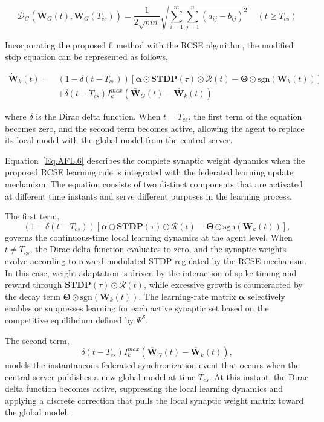 \begin{equation} \label{Eq.AFL.5}
\mathcal{D}_{G}(\bm{\overline{W}}_{G}(t), \bm{\overline{W}}_{G}(T_{cs})) = \frac{1}{2 \sqrt{mn}}\sqrt{\sum_{i=1}^{m}\sum_{j=1}^{n} (a_{ij} - b_{ij})^2}\;\;\;\; (t \geq T_{cs})
\end{equation}

\noindent Incorporating the proposed \ac{fl} method with the \ac{RCSE} algorithm, the modified \ac{stdp} equation can be represented as follows,

\begin{align} \label{Eq.AFL.6}
    \dot{\bm{W}}_{k}(t) = & (1-\delta(t-T_{cs})) \left[ \bm{\alpha} \odot \textbf{STDP}(\tau) \odot \mathcal{R}(t) - \bm{\Theta} \odot \text{sgn}(\bm{W}_{k}(t)) \right] \nonumber \\
    & + \delta(t-T_{cs})I_{k}^{max}\left(\bm{\overline{W}}_{G}(t) - \bm{\overline{W}}_{k}(t)\right)
\end{align}

\noindent where \(\delta\) is the Dirac delta function. When $t=T_{cs}$, the first term of the equation becomes zero, and the second term becomes active, allowing the agent to replace its local model with the global model from the central server.

Equation~\eqref{Eq.AFL.6} describes the complete synaptic weight dynamics when the proposed \ac{RCSE} learning rule is integrated with the federated learning update mechanism. The equation consists of two distinct components that are activated at different time instants and serve different purposes in the learning process.

The first term,
\[
(1-\delta(t-T_{cs})) \left[ \bm{\alpha} \odot \textbf{STDP}(\tau) \odot \mathcal{R}(t)
- \bm{\Theta} \odot \text{sgn}(\bm{W}_{k}(t)) \right],
\]
governs the continuous-time local learning dynamics at the agent level. When $t \neq T_{cs}$, the Dirac delta function evaluates to zero, and the synaptic weights evolve according to reward-modulated STDP regulated by the \ac{RCSE} mechanism. In this case, weight adaptation is driven by the interaction of spike timing and reward through $\textbf{STDP}(\tau) \odot \mathcal{R}(t)$, while excessive growth is counteracted by the decay term $\bm{\Theta} \odot \text{sgn}(\bm{W}_{k}(t))$. The learning-rate matrix $\bm{\alpha}$ selectively enables or suppresses learning for each active synaptic set based on the competitive equilibrium defined by $\Psi^{\mathcal{S}}$.

The second term,
\[
\delta(t-T_{cs}) I_{k}^{max} \left(\bm{\overline{W}}_{G}(t) - \bm{\overline{W}}_{k}(t)\right),
\]
models the instantaneous federated synchronization event that occurs when the central server publishes a new global model at time $T_{cs}$. At this instant, the Dirac delta function becomes active, suppressing the local learning dynamics and applying a discrete correction that pulls the local synaptic weight matrix toward the global model.

